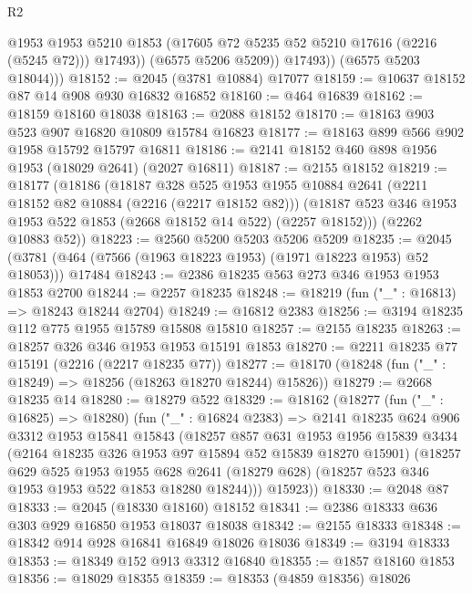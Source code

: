 \begin{lexlean}{R2}
\begin{coremodule}
                  @1953
                  @1953
                  @5210
                  @1853
                  (@17605 @72 @5235 @52 @5210 @17616 (@2216 (@5245 @72)))
                  @17493))
              (@6575 @5206 @5209))
            @17493))
        (@6575 @5203 @18044)))
@18152 := @2045 (@3781 @10884) @17077
@18159 := @10637 @18152 @87 @14 @908 @930 @16832 @16852
@18160 := @464 @16839
@18162 := @18159 @18160 @18038
@18163 := @2088 @18152
@18170 := @18163 @903 @523 @907 @16820 @10809 @15784 @16823
@18177 := @18163 @899 @566 @902 @1958 @15792 @15797 @16811
@18186 := @2141 @18152 @460 @898 @1956 @1953 (@18029 @2641) (@2027 @16811)
@18187 := @2155 @18152
@18219 := @18177
    (@18186
      (@18187
        @328
        @525
        @1953
        @1955
        @10884
        @2641
        (@2211 @18152 @82 @10884 (@2216 (@2217 @18152 @82)))
        (@18187 @523 @346 @1953 @1953 @522 @1853 (@2668 @18152 @14 @522) (@2257 @18152)))
      (@2262 @10883 @52))
@18223 := @2560 @5200 @5203 @5206 @5209
@18235 := @2045 (@3781 (@464 (@7566 (@1963 @18223 @1953) (@1971 @18223 @1953) @52 @18053))) @17484
@18243 := @2386 @18235 @563 @273 @346 @1953 @1953 @1853 @2700
@18244 := @2257 @18235
@18248 := @18219 (fun ("_" : @16813) => @18243 @18244 @2704)
@18249 := @16812 @2383
@18256 := @3194 @18235 @112 @775 @1955 @15789 @15808 @15810
@18257 := @2155 @18235
@18263 := @18257 @326 @346 @1953 @1953 @15191 @1853
@18270 := @2211 @18235 @77 @15191 (@2216 (@2217 @18235 @77))
@18277 := @18170 (@18248 (fun ("_" : @18249) => @18256 (@18263 @18270 @18244) @15826))
@18279 := @2668 @18235 @14
@18280 := @18279 @522
@18329 := @18162
    (@18277
      (fun ("_" : @16825) => @18280)
      (fun ("_" : @16824 @2383) =>
      @2141
        @18235
        @624
        @906
        @3312
        @1953
        @15841
        @15843
        (@18257
          @857
          @631
          @1953
          @1956
          @15839
          @3434
          (@2164 @18235 @326 @1953 @97 @15894 @52 @15839 @18270 @15901)
          (@18257
            @629
            @525
            @1953
            @1955
            @628
            @2641
            (@18279 @628)
            (@18257 @523 @346 @1953 @1953 @522 @1853 @18280 @18244)))
        @15923))
@18330 := @2048 @87
@18333 := @2045 (@18330 @18160) @18152
@18341 := @2386 @18333 @636 @303 @929 @16850 @1953 @18037 @18038
@18342 := @2155 @18333
@18348 := @18342 @914 @928 @16841 @16849 @18026 @18036
@18349 := @3194 @18333
@18353 := @18349 @152 @913 @3312 @16840
@18355 := @1857 @18160 @1853
@18356 := @18029 @18355
@18359 := @18353 (@4859 @18356) @18026

\end{coremodule}
\end{lexlean}
